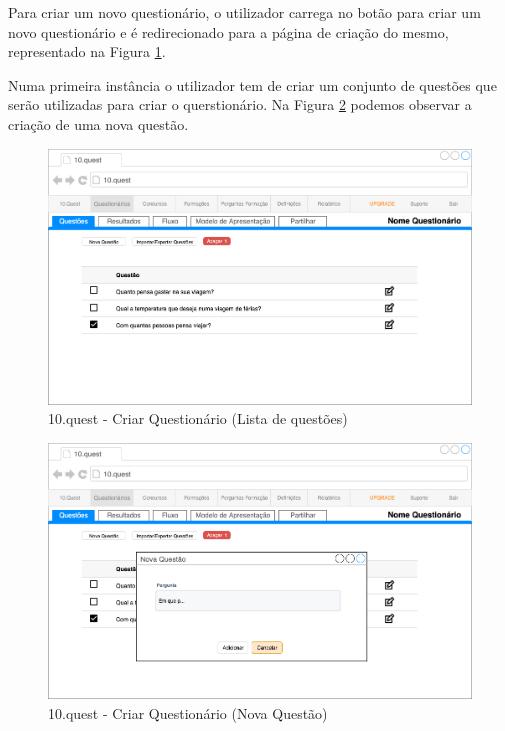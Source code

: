 Para criar um novo questionário, o utilizador carrega no botão para criar um novo questionário e é redirecionado para a página de criação do mesmo, representado na Figura \ref{10q-questoes}.

Numa primeira instância o utilizador tem de criar um conjunto de questões que serão utilizadas para criar o querstionário. Na Figura \ref{10q-Nquestao} podemos observar a criação de uma nova questão.

\clearpage


\mbox{}
\begin{figure}[ht!]
	\begin{center}
		\includegraphics[width=1\textwidth]{img/prototipos/13.png}
		\caption{10.quest - Criar Questionário (Lista de questões)}
		\label{10q-questoes}
	\end{center}
\end{figure}

\begin{figure}[ht!]
	\begin{center}
		\includegraphics[width=1\textwidth]{img/prototipos/14.png}
		\caption{10.quest - Criar Questionário (Nova Questão) }
		\label{10q-Nquestao}
	\end{center}
\end{figure}
\newpage

